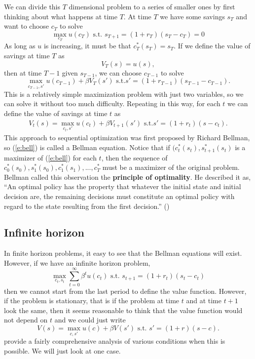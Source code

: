 We can divide this $T$ dimensional problem to a
series of smaller ones by first thinking about what happens at time
$T$. At time $T$ we have some savings $s_T$ and want to choose $c_T$
to solve
\[ \max_{c_T} u(c_T) \text{ s.t. } s_{T+1} = (1+r_T)(s_T -c_T) = 0 \]
As long as $u$ is increasing, it must be that $c_T^*(s_T) = s_T$. If
we define the value of savings at time $T$ as
\[ V_T(s) = u(s), \]
then at time $T-1$ given $s_{T-1}$, we can choose $c_{T-1}$ to solve
\[ \max_{c_{T-1},s'} u(c_{T-1}) + \beta V_T(s') \text{ s.t.} s' =
  (1+r_{T-1})(s_{T-1}-c_{T-1}). \]
This is a relatively simple maximization problem with just two
variables, so we can solve it without too much difficulty. Repeating
in this way, for each $t$ we can define the value of savings at time
$t$ as
\begin{align} 
  V_t(s) = \max_{c_t,s'} u(c_{t}) + \beta V_{t+1}(s') \text{ s.t.} s' =
  (1+r_{t})(s - c_{t}). \label{e:bell}
\end{align}
This approach to sequential optimization was first proposed by Richard
Bellman, so (\ref{e:bell}) is called a Bellman equation. Notice that
if $(c_t^*(s_t),s_{t+1}^*(s_t)$ is a maximizer of (\ref{e:bell}) for
each $t$, then 
the sequence of $c_0^*(s_0),s_1^*(s_0), c_1^*(s_1), ..., c_T^*$ must
be a maximizer of the original problem. Bellman called this
observation the \textbf{principle of optimality}. He described it as,
``An optimal policy has the property that whatever the initial state
and initial decision are, the remaining decisions must constitute an
optimal policy with regard to the state resulting from the first
decision.'' (\cite{bellman1962})

\subsection{Infinite horizon}
In finite horizon problems, it easy to see that the
Bellman equations will exist. However, if we have an infinite horizon
problem, 
\[ \max_{c_t,s_t} \sum_{t=0}^\infty \beta^t u(c_t) \text{ s.t. } s_{t+1} =
(1+r_t) (s_t - c_t) \]
then we cannot start from the last period to define the value
function. However, if the problem is stationary, that is if the
problem at time $t$ and at time $t+1$ look the same, then it seems
reasonable to think that the value function would not depend on $t$
and we could just write 
\[ V(s) = \max_{c,s'} u(c) + \beta V(s') \text{ s.t. } s' =
(1+r)(s-c). \]
\cite{stokey1989} provide a fairly comprehensive analysis of
various conditions when this is possible. We will just look at one
case. 

